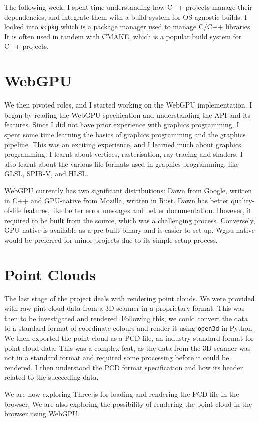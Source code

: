 The following week, I spent time understanding how C++ projects manage their dependencies, and integrate them with a build system for OS-agnostic builds.
I looked into \texttt{vcpkg} which is a package manager used to manage C/C++ libraries. It is often used in tandem with CMAKE, which is a popular build system for C++ projects.

\section{WebGPU}

We then pivoted roles, and I started working on the WebGPU implementation. I began by reading the WebGPU specification and understanding the API and its features. Since I did not have prior experience with graphics programming, I spent some time learning the basics of graphics programming and the graphics pipeline. This was an exciting experience, and I learned much about graphics programming. I learnt about vertices, rasterisation, ray tracing and shaders. I also learnt about the various file formats used in graphics programming, like GLSL, SPIR-V, and HLSL.

WebGPU currently has two significant distributions: Dawn from Google, written in C++ and GPU-native from Mozilla, written in Rust. Dawn has better quality-of-life features, like better error messages and better documentation. However, it required to be built from the source, which was a challenging process. Conversely, GPU-native is available as a pre-built binary and is easier to set up. Wgpu-native would be preferred for minor projects due to its simple setup process.

\section{Point Clouds}

The last stage of the project deals with rendering point clouds. We were provided with raw pint-cloud data from a 3D scanner in a proprietary format. This was then to be investigated and rendered. Following this, we could convert the data to a standard format of coordinate colours and render it using \texttt{open3d} in Python.
We then exported the point cloud as a PCD file, an industry-standard format for point-cloud data. This was a complex feat, as the data from the 3D scanner was not in a standard format and required some processing before it could be rendered. I then understood the PCD format specification and how its header related to the succeeding data.

We are now exploring Three.js for loading and rendering the PCD file in the browser. We are also exploring the possibility of rendering the point cloud in the browser using WebGPU.